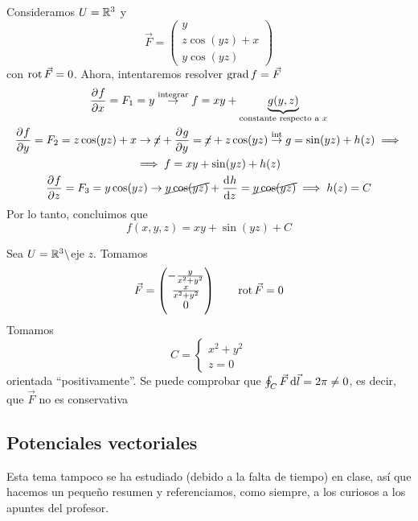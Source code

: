 \begin{example*}
    Consideramos $U = \mathbb{R}^3$ y 
    \[
        \vec{F} =
        \begin{pmatrix}
            y \\ z \cos (yz) + x \\ y \cos(yz)
        \end{pmatrix}
    \]
    con $\operatorname{rot} \vec{F} = 0$. Ahora, intentaremos resolver $\operatorname{grad} f = \vec{F}$
    \begin{gather*}
        \pdv{f}{x} = F_1 = y \stackrel{\text{integrar}}{\rightarrow} f = xy + \underbrace{g(y,z)}_{\text{constante respecto a } x} \\
        \pdv{f}{y} = F_2 = z \cos(yz) + x \rightarrow \cancel{x} + \pdv{g}{y} = \cancel{x} + z \cos(yz) \stackrel{\text{int}}{\rightarrow}
        g = \sin(yz) + h(z) \implies \\ \implies f = xy + \sin(yz) + h(z) \\
        \pdv{f}{z} = F_3 = y \cos (yz) \rightarrow \cancel{y \cos(yz)} + \dv{h}{z} = \cancel{y \cos(yz)} \implies h(z) = C
    \end{gather*}
    Por lo tanto, concluimos que
    \[
        f(x, y, z) = xy + \sin(yz) + C
    \]
\end{example*}

\begin{example*}
    Sea $U = \mathbb{R}^3 \setminus$eje $z$. Tomamos
    \[
        \vec{F} = 
        \begin{pmatrix}
            -\frac{y}{x^2 + y^2} \\ \frac{x}{x^2+y^2} \\ 0
        \end{pmatrix}
        \qquad
        \operatorname{rot} \vec{F} = 0
    \]
    Tomamos
    \[
        C =
        \begin{cases}
            x^2 + y^2 \\ z = 0
        \end{cases}
    \]
    orientada ``positivamente''. Se puede comprobar que $\oint_C \vec{F} \dif \vec{l} = 2\pi \neq 0$, es decir,
    que $\vec{F}$ no es conservativa
\end{example*}

\subsection*{Potenciales vectoriales}

Esta tema tampoco se ha estudiado (debido a la falta de tiempo) en clase, así que hacemos un pequeño resumen y referenciamos, como
siempre, a los curiosos a los apuntes del profesor.

